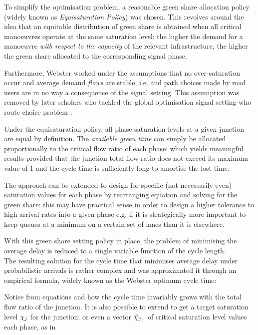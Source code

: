 To simplify the optimisation problem, a reasonable green share allocation policy (widely
known as \emph{Equisaturation Policy}) was chosen. This revolves around the idea that an equitable
distribution of green share is obtained when all critical manoeuvres operate at the same
saturation level: the higher the demand for a manoeuvre \emph{with respect to the capacity} of the
relevant infrastructure, the higher the green share allocated to the corresponding signal phase.

Furthermore, Webster worked under the assumptions that no over-saturation occur and average demand \emph{flows} are stable, i.e. and path choices made by road users are in no way a consequence of
the signal setting. This assumption was removed by later scholars who tackled the global
optimisation signal setting who route choice problem .

Under the equisaturation policy, all phase saturation levels at a given junction are equal
by definition. The \emph{available green time} can simply be allocated proportionally to the critical
flow ratio of each phase:
which yields meaningful results provided that the junction total flow ratio does not exceed its
maximum value of 1 and the cycle time is sufficiently long to amortise the lost time.

The approach can be extended to design for specific (not necessarily even) saturation
values for each phase by rearranging equation  and solving for the green share: this may have practical sense in order to design a higher tolerance to high arrival rates
into a given phase e.g. if it is strategically more important to keep queues at a minimum on a
certain set of lanes than it is elsewhere.

With this green share setting policy in place, the problem of minimising the average delay is reduced to a single variable function of the cycle length.\\
The resulting solution for the cycle time that minimises average delay under probabilistic arrivals is rather complex and was approximated it through an empirical formula, widely known as the Webster optimum cycle time:

Notice from equations  and  how the cycle time invariably grows with the total flow ratio of the junction.
It is also possible to extend  to get a target saturation level $\chi_j$
for the junction:
or even a vector $\vec{\chi}_{\mathrm{P}_j}$ of critical saturation level values each phase, as in

